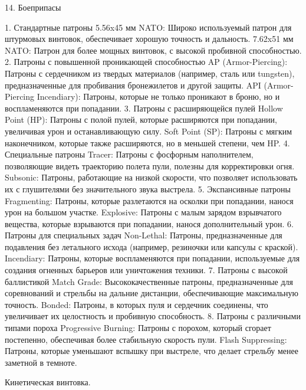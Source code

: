 \documentclass[a4paper,12pt]{article}
\begin{document}
14. Боеприпасы

1. Стандартные патроны
5.56x45 мм NATO: Широко используемый патрон для штурмовых винтовок, обеспечивает хорошую точность и дальность.
7.62x51 мм NATO: Патрон для более мощных винтовок, с высокой пробивной способностью.
2. Патроны с повышенной проникающей способностью
AP (Armor-Piercing): Патроны с сердечником из твердых материалов (например, сталь или tungsten), предназначенные для пробивания бронежилетов и другой защиты.
API (Armor-Piercing Incendiary): Патроны, которые не только проникают в броню, но и воспламеняются при попадании.
3. Патроны с расширяющейся пулей
Hollow Point (HP): Патроны с полой пулей, которые расширяются при попадании, увеличивая урон и останавливающую силу.
Soft Point (SP): Патроны с мягким наконечником, которые также расширяются, но в меньшей степени, чем HP.
4. Специальные патроны
Tracer: Патроны с фосфорным наполнителем, позволяющие видеть траекторию полета пули, полезны для корректировки огня.
Subsonic: Патроны, работающие на низкой скорости, что позволяет использовать их с глушителями без значительного звука выстрела.
5. Экспансивные патроны
Fragmenting: Патроны, которые разлетаются на осколки при попадании, нанося урон на большом участке.
Explosive: Патроны с малым зарядом взрывчатого вещества, которые взрываются при попадании, нанося дополнительный урон.
6. Патроны для специальных задач
Non-Lethal: Патроны, предназначенные для подавления без летального исхода (например, резиночки или капсулы с краской).
Incendiary: Патроны, которые воспламеняются при попадании, используемые для создания огненных барьеров или уничтожения техники.
7. Патроны с высокой баллистикой
Match Grade: Высококачественные патроны, предназначенные для соревнований и стрельбы на дальние дистанции, обеспечивающие максимальную точность.
Bonded: Патроны, в которых пуля и сердечник соединены, что увеличивает их целостность и пробивную способность.
8. Патроны с различными типами пороха
Progressive Burning: Патроны с порохом, который сгорает постепенно, обеспечивая более стабильную скорость пули.
Flash Suppressing: Патроны, которые уменьшают вспышку при выстреле, что делает стрельбу менее заметной в темноте.

Кинетическая винтовка.
\end{document}
